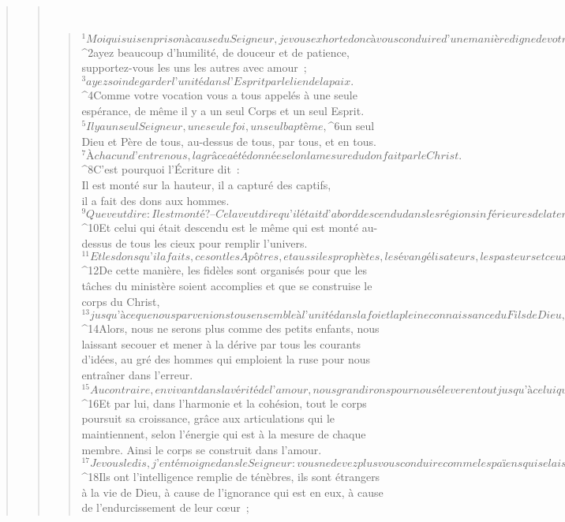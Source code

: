 \begin{verse}
\begin{verse}
         
      \bchapter{}
      \begin{verse}
${}^{1}Moi qui suis en prison à cause du Seigneur, je vous exhorte donc à vous conduire d’une manière digne de votre vocation : 
${}^{2}ayez beaucoup d’humilité, de douceur et de patience, supportez-vous les uns les autres avec amour ; 
${}^{3}ayez soin de garder l’unité dans l’Esprit par le lien de la paix. 
${}^{4}Comme votre vocation vous a tous appelés à une seule espérance, de même il y a un seul Corps et un seul Esprit. 
${}^{5}Il y a un seul Seigneur, une seule foi, un seul baptême, 
${}^{6}un seul Dieu et Père de tous, au-dessus de tous, par tous, et en tous.
${}^{7}À chacun d’entre nous, la grâce a été donnée selon la mesure du don fait par le Christ. 
${}^{8}C’est pourquoi l’Écriture dit :
        \\Il est monté sur la hauteur, il a capturé des captifs,
        \\il a fait des dons aux hommes.
${}^{9}Que veut dire : Il est monté ? – Cela veut dire qu’il était d’abord descendu dans les régions inférieures de la terre. 
${}^{10}Et celui qui était descendu est le même qui est monté au-dessus de tous les cieux pour remplir l’univers. 
${}^{11}Et les dons qu’il a faits, ce sont les Apôtres, et aussi les prophètes, les évangélisateurs, les pasteurs et ceux qui enseignent. 
${}^{12}De cette manière, les fidèles sont organisés pour que les tâches du ministère soient accomplies et que se construise le corps du Christ, 
${}^{13}jusqu’à ce que nous parvenions tous ensemble à l’unité dans la foi et la pleine connaissance du Fils de Dieu, à l’état de l’Homme parfait, à la stature du Christ dans sa plénitude. 
${}^{14}Alors, nous ne serons plus comme des petits enfants, nous laissant secouer et mener à la dérive par tous les courants d’idées, au gré des hommes qui emploient la ruse pour nous entraîner dans l’erreur. 
${}^{15}Au contraire, en vivant dans la vérité de l’amour, nous grandirons pour nous élever en tout jusqu’à celui qui est la Tête, le Christ. 
${}^{16}Et par lui, dans l’harmonie et la cohésion, tout le corps poursuit sa croissance, grâce aux articulations qui le maintiennent, selon l’énergie qui est à la mesure de chaque membre. Ainsi le corps se construit dans l’amour.
${}^{17}Je vous le dis, j’en témoigne dans le Seigneur : vous ne devez plus vous conduire comme les païens qui se laissent guider par le néant de leur pensée. 
${}^{18}Ils ont l’intelligence remplie de ténèbres, ils sont étrangers à la vie de Dieu, à cause de l’ignorance qui est en eux, à cause de l’endurcissement de leur cœur ; 

\end{verse}
\end{verse}
\end{verse}
